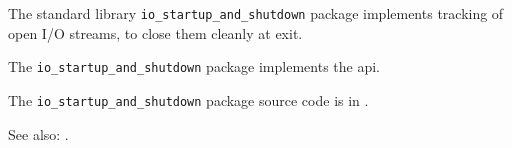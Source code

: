 
The standard library {\tt io\_startup\_and\_shutdown} package implements tracking of open I/O streams, to close them cleanly at exit.

The {\tt io\_startup\_and\_shutdown} package implements the  api.

The {\tt io\_startup\_and\_shutdown} package source code is in .

See also: .

